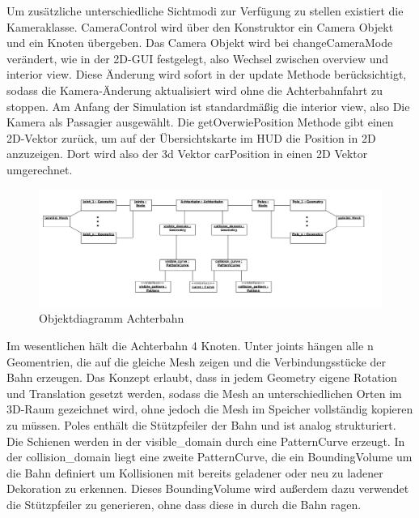 Um zusätzliche unterschiedliche Sichtmodi zur Verfügung zu stellen existiert die Kameraklasse. CameraControl wird über den Konstruktor ein Camera Objekt und ein Knoten übergeben. Das Camera Objekt wird bei changeCameraMode verändert, wie in der 2D-GUI festgelegt, also Wechsel zwischen overview und interior view. Diese Änderung wird sofort in der update Methode berücksichtigt, sodass die Kamera-Änderung aktualisiert wird ohne die Achterbahnfahrt zu stoppen. Am Anfang der Simulation ist standardmäßig die interior view, also Die Kamera als Passagier ausgewählt. Die getOverwiePosition Methode gibt einen 2D-Vektor zurück, um auf der Übersichtskarte im HUD die Position in 2D anzuzeigen. Dort wird also der 3d Vektor carPosition in einen 2D Vektor umgerechnet.


\begin{figure}
\includegraphics[width=\linewidth]{bilder/objektdiagramm_004}
\caption{Objektdiagramm Achterbahn}
\end{figure}

Im wesentlichen hält die Achterbahn 4 Knoten. Unter joints hängen alle n Geomentrien, die auf die gleiche Mesh zeigen und die Verbindungsstücke der Bahn erzeugen. Das Konzept erlaubt, dass in jedem Geometry eigene Rotation und 
Translation gesetzt werden, sodass die Mesh an unterschiedlichen Orten im 3D-Raum gezeichnet wird, ohne jedoch die Mesh im Speicher vollständig kopieren zu müssen. Poles enthält die Stützpfeiler der Bahn und ist analog strukturiert.
Die Schienen werden in der visible\_domain durch eine PatternCurve erzeugt. In der collision\_domain liegt eine zweite PatternCurve, die ein BoundingVolume um die Bahn definiert um Kollisionen mit bereits geladener oder neu zu ladener
Dekoration zu erkennen. Dieses BoundingVolume wird außerdem dazu verwendet die Stützpfeiler zu generieren, ohne dass diese in durch die Bahn ragen.



